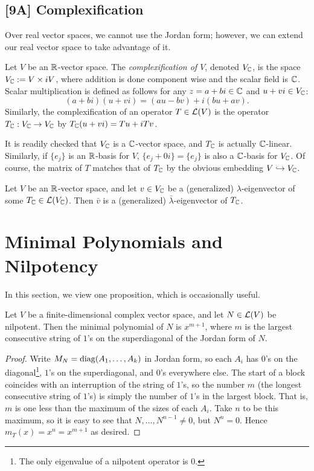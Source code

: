 \documentclass{article}
\begin{document}
\subsection*{[9A] Complexification}
Over real vector spaces, we cannot use the Jordan form; however, we can extend our real vector space to take advantage of it.
\begin{definition}
Let $V$ be an $\mathbb R$-vector space. The \textit{complexification of $V$}, denoted $V_\mathbb C$, is the space $V_\mathbb C := V \times iV$, where addition is done component wise and the scalar field is $\mathbb C$. Scalar multiplication is defined as follows for any $z = a+bi\in \mathbb C$ and $u+vi\in V_\mathbb C$:
$$(a+bi)(u+vi) = (au-bv) + i(bu + av).$$
Similarly, the complexification of an operator $T\in\mathcal L(V)$ is the operator $T_\mathbb C: V_\mathbb C \to V_\mathbb C$ by $T_\mathbb C(u+vi) = Tu + iTv$.
\end{definition}

It is readily checked that $V_\mathbb C$ is a $\mathbb C$-vector space, and $T_\mathbb C$ is actually $\mathbb C$-linear. Similarly, if $\{e_j\}$ is an $\mathbb R$-basis for $V$, $\{e_j + 0i\} = \{e_j\}$ is also a $\mathbb C$-basis for $V_\mathbb C$. Of course, the matrix of $T$ matches that of $T_\mathbb C$ by the obvious embedding $V\hookrightarrow V_\mathbb C$.
\begin{proposition}
Let $V$ be an $\mathbb R$-vector space, and let $v\in V_\mathbb C$ be a (generalized) $\lambda$-eigenvector of some $T_\mathbb C\in\mathcal L(V_\mathbb C)$. Then $\bar v$ is a (generalized) $\bar\lambda$-eigenvector of $T_\mathbb C$.
\end{proposition}
\section{Minimal Polynomials and Nilpotency}
In this section, we view one proposition, which is occasionally useful.
\begin{proposition}
Let $V$ be a finite-dimensional complex vector space, and let $N\in\mathcal L(V)$ be nilpotent. Then the minimal polynomial of $N$ is $x^{m+1}$, where $m$ is the largest consecutive string of $1$'s on the superdiagonal of the Jordan form of $N$.
\end{proposition}
\begin{proof}
Write $M_N = \operatorname{diag}(A_1, \ldots, A_k)$ in Jordan form, so each $A_i$ has $0$'s on the diagonal\footnote{The only eigenvalue of a nilpotent operator is $0$.}, $1$'s on the superdiagonal, and $0$'s everywhere else. The start of a block coincides with an interruption of the string of $1$'s, so the number $m$ (the longest consecutive string of $1$'s) is simply the number of $1$'s in the largest block. That is, $m$ is one less than the maximum of the sizes of each $A_i$. Take $n$ to be this maximum, so it is easy to see that $N, \ldots, N^{n-1}\neq 0$, but $N^n = 0$. Hence $m_T(x) = x^n = x^{m+1}$ as desired.
\end{proof}
\newpage
{}
\end{document}

